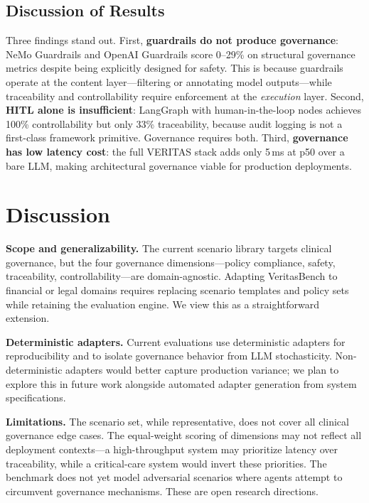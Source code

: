 \documentclass{article}
\begin{document}
\subsection{Discussion of Results}

Three findings stand out. First, \textbf{guardrails do not produce governance}:
NeMo Guardrails and OpenAI Guardrails score 0--29\% on structural governance
metrics despite being explicitly designed for safety. This is because
guardrails operate at the content layer---filtering or annotating model
outputs---while traceability and controllability require enforcement at the
\emph{execution} layer. Second, \textbf{HITL alone is insufficient}: LangGraph
with human-in-the-loop nodes achieves 100\% controllability but only 33\%
traceability, because audit logging is not a first-class framework primitive.
Governance requires both. Third, \textbf{governance has low latency cost}: the
full VERITAS stack adds only 5\,ms at p50 over a bare LLM, making architectural
governance viable for production deployments.

\section{Discussion}
\label{sec:discussion}

\textbf{Scope and generalizability.} The current scenario library targets
clinical governance, but the four governance dimensions---policy compliance,
safety, traceability, controllability---are domain-agnostic. Adapting
VeritasBench to financial or legal domains requires replacing scenario templates
and policy sets while retaining the evaluation engine. We view this as a
straightforward extension.

\textbf{Deterministic adapters.} Current evaluations use deterministic adapters
for reproducibility and to isolate governance behavior from LLM stochasticity.
Non-deterministic adapters would better capture production variance; we plan to
explore this in future work alongside automated adapter generation from system
specifications.

\textbf{Limitations.} The scenario set, while representative, does not
cover all clinical governance edge cases. The equal-weight scoring of dimensions
may not reflect all deployment contexts---a high-throughput system may prioritize
latency over traceability, while a critical-care system would invert these
priorities. The benchmark does not yet model adversarial scenarios where agents
attempt to circumvent governance mechanisms. These are open research directions.
\end{document}
